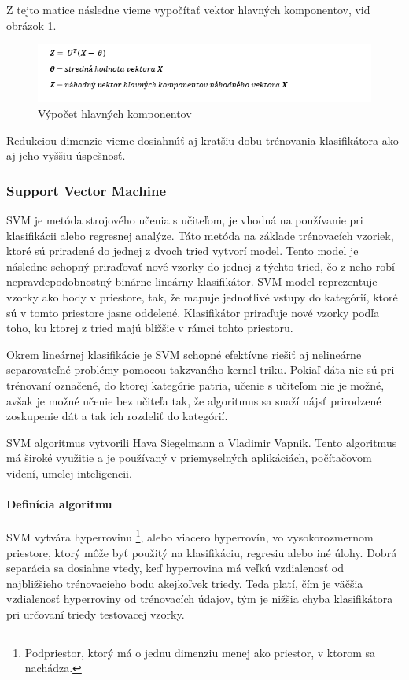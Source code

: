 Z tejto matice následne vieme vypočítať vektor hlavných komponentov, viď obrázok \ref{PCAhlav}.

\begin{figure}[H]
  \centering
  \includegraphics[width=16cm]{img/PCAhlavnekomponenty.png}
  \caption{Výpočet hlavných komponentov}
  \label{PCAhlav}
\end{figure}
\cite{c17}

Redukciou dimenzie vieme dosiahnúť aj kratšiu dobu trénovania klasifikátora ako aj jeho vyššiu úspešnosť. 


\subsubsection{Support Vector Machine} \label{SVMlabel}
SVM je metóda strojového učenia s učiteľom, je vhodná na používanie pri klasifikácii alebo regresnej analýze. Táto metóda na základe trénovacích vzoriek, ktoré sú priradené do jednej z dvoch tried vytvorí model. Tento model je následne schopný priraďovať nové vzorky do jednej z týchto tried, čo z neho robí nepravdepodobnostný binárne lineárny klasifikátor. SVM model reprezentuje vzorky ako body v priestore, tak, že mapuje jednotlivé vstupy do kategórií, ktoré sú v tomto priestore jasne oddelené. Klasifikátor priraďuje nové vzorky podľa toho, ku ktorej z tried majú bližšie v rámci tohto priestoru.

Okrem lineárnej klasifikácie je SVM schopné efektívne riešiť aj nelineárne separovateľné problémy pomocou takzvaného kernel triku. Pokiaľ dáta nie sú pri trénovaní označené, do ktorej kategórie patria, učenie s učiteľom nie je možné, avšak je možné učenie bez učiteľa tak, že algoritmus sa snaží nájsť prirodzené zoskupenie dát a tak ich rozdeliť do kategórií.

SVM algoritmus vytvorili Hava Siegelmann a Vladimir Vapnik. Tento algoritmus má široké využitie a je používaný v priemyselných aplikáciách, počítačovom videní, umelej inteligencii.  \cite{c7}

\paragraph{Definícia algoritmu}
SVM vytvára hyperrovinu \footnote{Podpriestor, ktorý má o jednu dimenziu menej ako priestor, v ktorom sa nachádza.}, alebo viacero hyperrovín, vo vysokorozmernom priestore, ktorý môže byť použitý na klasifikáciu, regresiu alebo iné úlohy. Dobrá separácia sa dosiahne vtedy, keď hyperrovina má veľkú vzdialenosť od najbližšieho trénovacieho bodu akejkoľvek triedy. Teda platí, čím je väčšia vzdialenosť hyperroviny od trénovacích údajov, tým je nižšia chyba klasifikátora pri určovaní triedy testovacej vzorky.\cite{c12}

